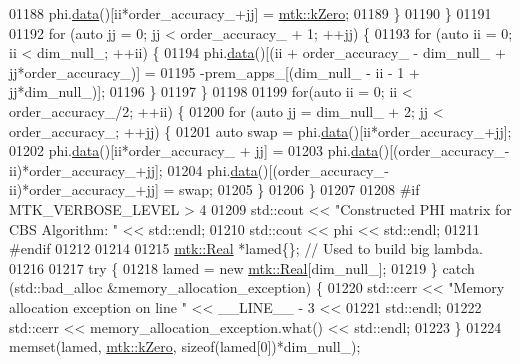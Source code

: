 \begin{DoxyCode}
{{01188         phi.\hyperlink{classmtk_1_1DenseMatrix_a0c33b8a9e01d157c61ddbdf807c25d84}{data}()[ii*order\_accuracy\_+jj] = \hyperlink{group__c01-roots_ga59a451a5fae30d59649bcda274fea271}{mtk::kZero};
01189       \}
01190     \}
01191 
01192     \textcolor{keywordflow}{for} (\textcolor{keyword}{auto} jj = 0; jj < order\_accuracy\_ + 1; ++jj) \{
01193       \textcolor{keywordflow}{for} (\textcolor{keyword}{auto} ii = 0; ii < dim\_null\_; ++ii) \{
01194         phi.\hyperlink{classmtk_1_1DenseMatrix_a0c33b8a9e01d157c61ddbdf807c25d84}{data}()[(ii + order\_accuracy\_ - dim\_null\_ + jj*order\_accuracy\_)] =
01195           -prem\_apps\_[(dim\_null\_ - ii - 1 + jj*dim\_null\_)];
01196       \}
01197     \}
01198 
01199     \textcolor{keywordflow}{for}(\textcolor{keyword}{auto} ii = 0; ii < order\_accuracy\_/2; ++ii) \{
01200       \textcolor{keywordflow}{for} (\textcolor{keyword}{auto} jj = dim\_null\_ + 2; jj < order\_accuracy\_; ++jj) \{
01201         \textcolor{keyword}{auto} swap = phi.\hyperlink{classmtk_1_1DenseMatrix_a0c33b8a9e01d157c61ddbdf807c25d84}{data}()[ii*order\_accuracy\_+jj];
01202         phi.\hyperlink{classmtk_1_1DenseMatrix_a0c33b8a9e01d157c61ddbdf807c25d84}{data}()[ii*order\_accuracy\_ + jj] =
01203           phi.\hyperlink{classmtk_1_1DenseMatrix_a0c33b8a9e01d157c61ddbdf807c25d84}{data}()[(order\_accuracy\_-ii)*order\_accuracy\_+jj];
01204         phi.\hyperlink{classmtk_1_1DenseMatrix_a0c33b8a9e01d157c61ddbdf807c25d84}{data}()[(order\_accuracy\_-ii)*order\_accuracy\_+jj] = swap;
01205       \}
01206     \}
01207 
01208 \textcolor{preprocessor}{    #if MTK\_VERBOSE\_LEVEL > 4}
01209     std::cout << \textcolor{stringliteral}{"Constructed PHI matrix for CBS Algorithm: "} << std::endl;
01210     std::cout << phi << std::endl;
01211 \textcolor{preprocessor}{    #endif}
01212 
01214 
01215     \hyperlink{group__c01-roots_gac080bbbf5cbb5502c9f00405f894857d}{mtk::Real} *lamed\{\};  \textcolor{comment}{// Used to build big lambda.}
01216 
01217     \textcolor{keywordflow}{try} \{
01218       lamed = \textcolor{keyword}{new} \hyperlink{group__c01-roots_gac080bbbf5cbb5502c9f00405f894857d}{mtk::Real}[dim\_null\_];
01219     \} \textcolor{keywordflow}{catch} (std::bad\_alloc &memory\_allocation\_exception) \{
01220       std::cerr << \textcolor{stringliteral}{"Memory allocation exception on line "} << \_\_LINE\_\_ - 3 <<
01221         std::endl;
01222       std::cerr << memory\_allocation\_exception.what() << std::endl;
01223     \}
01224     memset(lamed, \hyperlink{group__c01-roots_ga59a451a5fae30d59649bcda274fea271}{mtk::kZero}, \textcolor{keyword}{sizeof}(lamed[0])*dim\_null\_);
}}
\end{DoxyCode}
